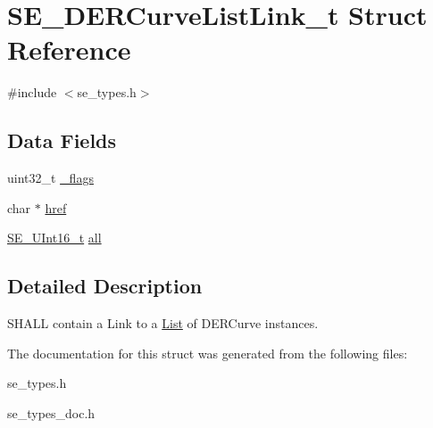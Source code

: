 \hypertarget{structSE__DERCurveListLink__t}{}\section{S\+E\+\_\+\+D\+E\+R\+Curve\+List\+Link\+\_\+t Struct Reference}
\label{structSE__DERCurveListLink__t}


{\ttfamily \#include $<$se\+\_\+types.\+h$>$}

\subsection*{Data Fields}
\begin{DoxyCompactItemize}
\item 
uint32\+\_\+t \hyperlink{group__DERCurveListLink_gacdf332cf076235a033cec9d50958c3c5}{\+\_\+flags}
\item 
char $\ast$ \hyperlink{group__DERCurveListLink_ga78be8068f0ce6e8e040f5d59a71335fc}{href}
\item 
\hyperlink{group__UInt16_gac68d541f189538bfd30cfaa712d20d29}{S\+E\+\_\+\+U\+Int16\+\_\+t} \hyperlink{group__DERCurveListLink_gaa089d77a177cf9db75d2c3d09016bd69}{all}
\end{DoxyCompactItemize}


\subsection{Detailed Description}
S\+H\+A\+LL contain a Link to a \hyperlink{structList}{List} of D\+E\+R\+Curve instances. 

The documentation for this struct was generated from the following files\+:\begin{DoxyCompactItemize}
\item 
se\+\_\+types.\+h\item 
se\+\_\+types\+\_\+doc.\+h\end{DoxyCompactItemize}
